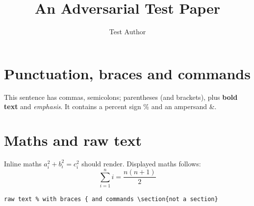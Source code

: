 \documentclass[11pt]{article}
\title{An Adversarial Test Paper}
\author{Test Author}
\begin{document}
\maketitle

\section{Punctuation, braces and commands}
This sentence has commas, semicolons; parentheses (and brackets), plus \textbf{bold text} and \emph{emphasis}.  It contains a percent sign \% and an ampersand \&.



\section{Maths and raw text}
Inline maths $a_{i}^{2} + b_{i}^{2} = c_{i}^{2}$ should render.  Displayed maths follows:
\[
  \sum_{i=1}^{n} i = \frac{n(n+1)}{2}
\]

\begin{verbatim}
raw text % with braces { and commands \section{not a section}
\end{verbatim}
\end{document}
